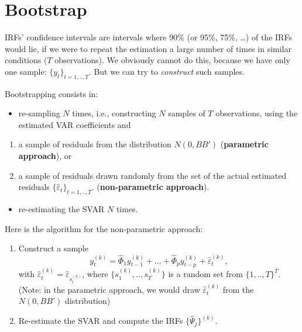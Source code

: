 \documentclass[
  12pt,
]{book}
\providecommand{\tightlist}{%
  \setlength{\itemsep}{0pt}\setlength{\parskip}{0pt}}
\theoremstyle{definition}
\theoremstyle{definition}
\theoremstyle{definition}
\theoremstyle{definition}
\theoremstyle{remark}
\begin{document}
\section{Bootstrap}\label{bootstrap}

IRFs' confidence intervals are intervals where 90\% (or 95\%, 75\%, \ldots) of the IRFs would lie, if we were to repeat the estimation a large number of times in similar conditions (\(T\) observations). We obviously cannot do this, because we have only one sample: \(\{y_t\}_{t=1,..,T}\). But we can try to \emph{construct} such samples.

Bootstrapping consists in:

\begin{itemize}
\tightlist
\item
  re-sampling \(N\) times, i.e., constructing \(N\) samples of \(T\) observations, using the estimated
  VAR coefficients and
\end{itemize}

\begin{enumerate}
\def\labelenumi{\alph{enumi}.}
\tightlist
\item
  a sample of residuals from the distribution \(N(0,BB')\) (\textbf{parametric approach}), or
\item
  a sample of residuals drawn randomly from the set of the actual estimated residuals \(\{\hat\varepsilon_t\}_{t=1,..,T}\). (\textbf{non-parametric approach}).
\end{enumerate}

\begin{itemize}
\tightlist
\item
  re-estimating the SVAR \(N\) times.
\end{itemize}

Here is the algorithm for the non-parametric approach:

\begin{enumerate}
\def\labelenumi{\arabic{enumi}.}
\tightlist
\item
  Construct a sample
  \[
  y_t^{(k)}=\widehat{\Phi}_1 y_{t-1}^{(k)} + \dots + \widehat{\Phi}_p y_{t-p}^{(k)} + \hat\varepsilon_t^{(k)},
  \]
  with \(\hat\varepsilon_{t}^{(k)}=\hat\varepsilon_{s_t^{(k)}}\), where \(\{s_1^{(k)},..,s_T^{(k)}\}\) is a random set from \(\{1,..,T\}^T\). (Note: in the parametric approach, we would draw \(\hat\varepsilon_{t}^{(k)}\) from the \(N(0,BB')\) distribution)
\item
  Re-estimate the SVAR and compute the IRFs \(\{\widehat{\Psi}_j\}^{(k)}\).
\end{enumerate}
\end{document}
